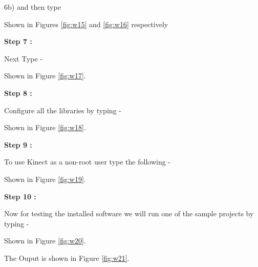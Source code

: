 \begin{flushleft}

\medskip 

6b) and then type

\medskip


\medskip
Shown in Figures \ref{fig:w15} and \ref{fig:w16} respectively

\medskip
\textbf{Step 7 :}

\medskip

Next Type - 

\medskip


\medskip
Shown in Figure \ref{fig:w17}.

\medskip
\textbf{Step 8 :}

\medskip

Configure all the libraries by typing - 

\medskip


\medskip

Shown in Figure \ref{fig:w18}.

\medskip
\textbf{Step 9 :}

\medskip

To use Kinect as a non-root user type the following -

\medskip


\medskip
Shown in Figure \ref{fig:w19}.

\medskip

\medskip

\textbf{Step 10 :}

\medskip

Now for testing the installed software we will run one of the sample projects by typing - 

\medskip


\medskip

Shown in Figure \ref{fig:w20}.
\medskip

The Ouput is shown in Figure \ref{fig:w21}.


\end{flushleft}
